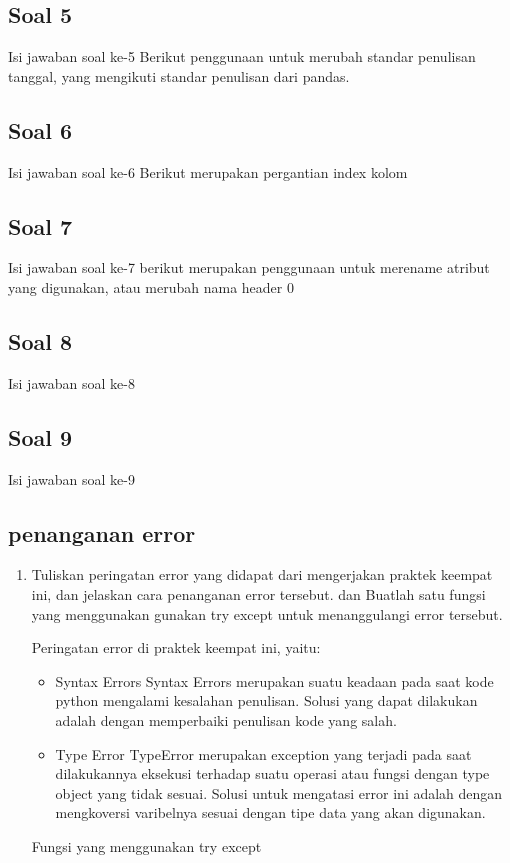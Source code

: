 \subsection{Soal 5}
Isi jawaban soal ke-5
 Berikut penggunaan untuk merubah standar penulisan tanggal, yang mengikuti standar penulisan dari pandas.
    
\subsection{Soal 6}
Isi jawaban soal ke-6
 Berikut merupakan pergantian index kolom
    
\subsection{Soal 7}
Isi jawaban soal ke-7
 berikut merupakan penggunaan untuk merename atribut yang digunakan, atau merubah nama header 0
    
\subsection{Soal 8}
Isi jawaban soal ke-8
  
\subsection{Soal 9}
Isi jawaban soal ke-9
 
\subsection{penanganan error}
\begin{enumerate}
	\item Tuliskan  peringatan  error  yang  didapat  dari  mengerjakan  praktek  keempat  ini, dan  jelaskan  cara  penanganan  error  tersebut.   dan  Buatlah  satu  fungsi  yang menggunakan gunakan try except untuk menanggulangi error tersebut.
	
	Peringatan error di praktek keempat ini, yaitu:
	\begin{itemize}
		\item Syntax Errors
		Syntax Errors merupakan suatu keadaan pada saat kode python mengalami kesalahan penulisan. Solusi yang dapat dilakukan adalah dengan memperbaiki penulisan kode yang salah.
		
		\item Type Error
		TypeError merupakan exception yang terjadi pada saat dilakukannya eksekusi terhadap suatu operasi atau fungsi dengan type object yang tidak sesuai. Solusi untuk mengatasi error ini adalah dengan mengkoversi varibelnya sesuai dengan tipe data yang akan digunakan.
	\end{itemize}
Fungsi yang menggunakan try except
	
\end{enumerate}

